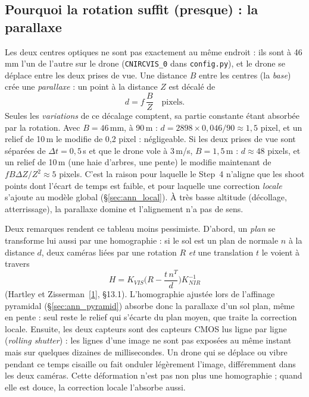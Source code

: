 \documentclass[a4paper,11pt]{report}
\begin{document}
\subsection{Pourquoi la rotation suffit (presque) : la parallaxe}
Les deux centres optiques ne sont pas exactement au même endroit : ils sont à 46\,mm l'un de l'autre sur le drone (\texttt{CNIRCVIS\_0} dans \texttt{config.py}), et le drone se déplace entre les deux prises de vue. Une distance $B$ entre les centres (la \emph{base}) crée une \emph{parallaxe} : un point à la distance $Z$ est décalé de
\begin{equation}
	d = f\,\frac{B}{Z} \quad \text{pixels}.
\end{equation}
Seules les \emph{variations} de ce décalage comptent, sa partie constante étant absorbée par la rotation. Avec $B = 46$\,mm, à 90\,m : $d = 2898 \times 0{,}046 / 90 \approx 1{,}5$ pixel, et un relief de 10\,m le modifie de 0,2 pixel : négligeable. Si les deux prises de vue sont séparées de $\Delta t = 0{,}5$\,s et que le drone vole à 3\,m/s, $B = 1{,}5$\,m : $d \approx 48$ pixels, et un relief de 10\,m (une haie d'arbres, une pente) le modifie maintenant de $f B \Delta Z / Z^2 \approx 5$ pixels. C'est la raison pour laquelle le Step~4 n'aligne que les shoot points dont l'écart de temps est faible, et pour laquelle une correction \emph{locale} s'ajoute au modèle global (§\ref{sec:ann_local}). À très basse altitude (décollage, atterrissage), la parallaxe domine et l'alignement n'a pas de sens.

Deux remarques rendent ce tableau moins pessimiste. D'abord, un \emph{plan} se transforme lui aussi par une homographie : si le sol est un plan de normale $n$ à la distance $d$, deux caméras liées par une rotation $R$ \emph{et} une translation $t$ le voient à travers
\begin{equation}\label{eq:ann_plane_homography}
	H = K_{VIS} \Big( R - \frac{t\, n^T}{d} \Big) K_{NIR}^{-1}
\end{equation}
(Hartley et Zisserman~[\hyperref[ann_hz]{1}], §13.1). L'homographie ajustée lors de l'affinage pyramidal (§\ref{sec:ann_pyramid}) absorbe donc la parallaxe d'un sol plan, même en pente : seul reste le relief qui s'écarte du plan moyen, que traite la correction locale. Ensuite, les deux capteurs sont des capteurs CMOS lus ligne par ligne (\emph{rolling shutter}) : les lignes d'une image ne sont pas exposées au même instant mais sur quelques dizaines de millisecondes. Un drone qui se déplace ou vibre pendant ce temps cisaille ou fait onduler légèrement l'image, différemment dans les deux caméras. Cette déformation n'est pas non plus une homographie ; quand elle est douce, la correction locale l'absorbe aussi.
\end{document}
